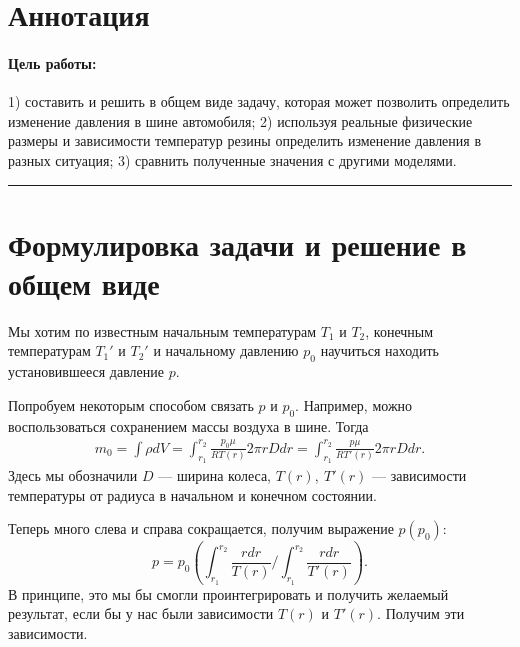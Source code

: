 \documentclass[a4paper,12pt]{report}
\begin{document}
	
	\newpage


    \section*{Аннотация}
        \paragraph*{Цель работы:} 1) составить и решить в общем виде задачу, которая может позволить определить изменение давления в шине автомобиля; 2) используя реальные физические размеры и зависимости температур резины определить изменение давления в разных ситуация; 3) сравнить полученные значения с другими моделями.
    \vspace{0.5cm}
    \hrule
    \section{Формулировка задачи и решение в общем виде}
        Мы хотим по известным начальным температурам $T_1$ и $T_2$, конечным температурам $T_1'$ и $T_2'$ и начальному давлению $p_0$ научиться находить установившееся давление $p$.

        Попробуем некоторым способом связать $p$ и $p_0$. Например, можно воспользоваться сохранением массы воздуха в шине. Тогда
        \begin{gather}
            m_0=\int \rho dV = \int_{r_1}^{r_2} \frac{p_0\mu}{RT(r)}2\pi r  D dr =\int_{r_1}^{r_2}\frac{p\mu}{RT'(r)}2\pi r D dr. 
        \end{gather}
        Здесь мы обозначили $D$ --- ширина колеса, $T(r),\ T'(r)$ --- зависимости температуры от радиуса в начальном и конечном состоянии.

        Теперь много слева и справа сокращается, получим выражение $p(p_0)$:
        \begin{equation}
            \label{p}
            p=p_0\left(\int_{r_1}^{r_2}\frac{rdr}{T(r)}/\int_{r_1}^{r_2}\frac{rdr}{T'(r)}\right).
        \end{equation}
        В принципе, это мы бы смогли проинтегрировать и получить желаемый результат, если бы у нас были зависимости $T(r)$ и $T'(r)$. Получим эти зависимости.
\end{document}
